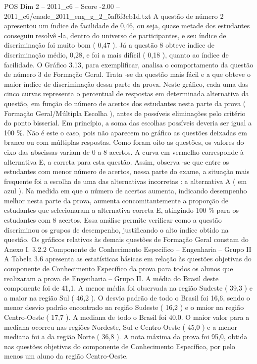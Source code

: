 \begin{textsample}{POS Dim 2 – 2011\_c6 – Score -2.00 – 2011\_c6/enade\_2011\_eng\_g\_2\_5af6f3cb1d.txt}
A questão de número 2 apresentou um índice de facilidade de 0,46, ou seja, quase metade dos estudantes conseguiu resolvê -la, dentro do universo de participantes, e seu índice de discriminação foi muito bom ( 0,47 ).
Já a questão 8 obteve índice de discriminação médio, 0,28, e foi a mais difícil ( 0,18 ), quanto ao índice de facilidade.
O Gráfico 3.13, para exemplificar, analisa o comportamento da questão de número 3 de Formação Geral.
Trata -se da questão mais fácil e a que obteve o maior índice de discriminação dessa parte da prova.
Neste gráfico, cada uma das cinco curvas representa o percentual de respostas em determinada alternativa da questão, em função do número de acertos dos estudantes nesta parte da prova ( Formação Geral/Múltipla Escolha ), antes de possíveis eliminações pelo critério do ponto bisserial.
Em princípio, a soma das escolhas possíveis deveria ser igual a 100 \%.
Não é este o caso, pois não aparecem no gráfico as questões deixadas em branco ou com múltiplas respostas.
Como foram oito as questões, os valores do eixo das abscissas variam de 0 a 8 acertos.
A curva em vermelho corresponde à alternativa E, a correta para esta questão.
Assim, observa -se que entre os estudantes com menor número de acertos, nessa parte do exame, a situação mais frequente foi a escolha de uma das alternativas incorretas : a alternativa A ( em azul ).
Na medida em que o número de acertos aumenta, indicando desempenho melhor nesta parte da prova, aumenta concomitantemente a proporção de estudantes que selecionaram a alternativa correta E, atingindo 100 \% para os estudantes com 8 acertos.
Essa análise permite verificar como a questão discriminou os grupos de desempenho, justificando o alto índice obtido na questão.
Os gráficos relativos às demais questões de Formação Geral constam do Anexo I. 3.2.2 Componente de Conhecimento Específico – Engenharia – Grupo II A Tabela 3.6 apresenta as estatísticas básicas em relação às questões objetivas do componente de Conhecimento Específico da prova para todos os alunos que realizaram a prova de Engenharia – Grupo II.
A média do Brasil deste componente foi de 41,1.
A menor média foi observada na região Sudeste ( 39,3 ) e a maior na região Sul ( 46,2 ).
O desvio padrão de todo o Brasil foi 16,6, sendo o menor desvio padrão encontrado na região Sudeste ( 16,2 ) e o maior na região Centro-Oeste ( 17,7 ).
A mediana de todo o Brasil foi 40,0.
O maior valor para a mediana ocorreu nas regiões Nordeste, Sul e Centro-Oeste ( 45,0 ) e a menor mediana foi a da região Norte ( 36,8 ).
A nota máxima da prova foi 95,0, obtida nas questões objetivas do componente de Conhecimento Específico, por pelo menos um aluno da região Centro-Oeste.

\end{textsample}
